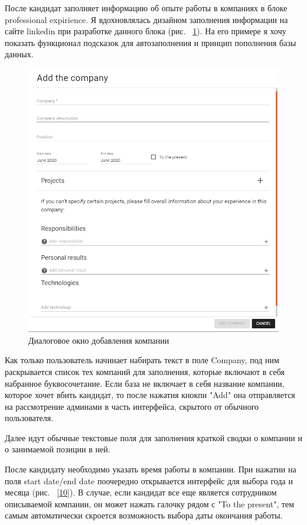 \documentclass[a4paper,12pt]{diplom}
\begin{document}
После кандидат заполняет информацию об опыте работы в компаниях в блоке professional expirience. Я вдохновлялась дизайном заполнения информации на сайте linkedin при разработке данного блока (рис. ~\ref{9}).
На его примере я хочу показать функционал подсказок для автозаполнения и принцип пополнения базы данных.
\begin{figure}[!ht]
\centering
\includegraphics[width=1\textwidth]{resources/companycard.png}
\caption{Диалоговое окно добавления компании}
\label{9}
\end{figure}

Как только пользователь начинает набирать текст в поле Company, под ним раскрывается список тех компаний для заполнения, которые включают в себя набранное буквосочетание.
Если база не включает в себя название компании, которое хочет вбить кандидат, то после нажатия кнокпи "Add" она
отправляется на рассмотрение админами в часть интерфейса, скрытого от обычного пользователя.

Далее идут обычные текстовые поля для заполнения краткой сводки о компании и о занимаемой позиции в ней.

После кандидату необходимо указать время работы в компании. При нажатии на поля start date/end date поочередно открывается интерфейс для выбора года и месяца (рис. ~\ref{10}).
В случае, если кандидат все еще является сотрудником описываемой компании, он может нажать галочку рядом с "To the present", тем самым автоматически скроется возможность выбора даты окончания работы.
\end{document}
